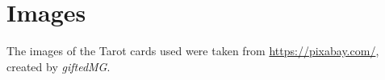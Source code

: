 \section{Images}
The images of the Tarot cards used were taken from \url{https://pixabay.com/}, created by \emph{giftedMG}.
